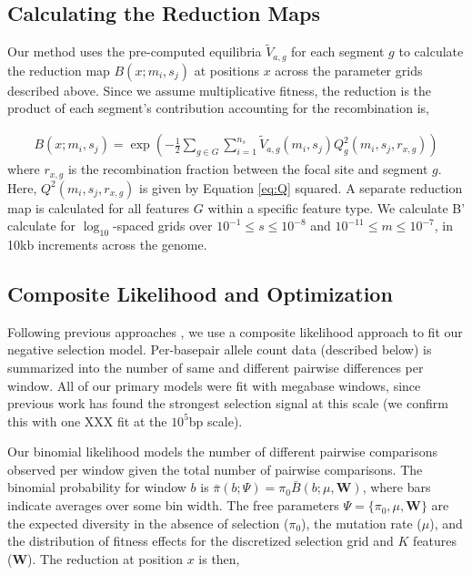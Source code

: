 \documentclass[11pt]{article}
\begin{document}
\subsection*{Calculating the Reduction Maps}
\label{sec:methods-maps}

Our method uses the pre-computed equilibria $\widetilde{V}_{a,g}$ for each
segment $g$ to calculate the reduction map $B(x; m_i, s_j)$ at positions $x$
across the parameter grids described above. Since we assume multiplicative
fitness, the reduction is the product of each segment's contribution accounting
for the recombination is,

\begin{align}
    B(x; m_i, s_j) = \exp\left(- \frac{1}{2}\sum_{g \in G} \sum_{i=1}^{n_s} \widetilde{V}_{a,g}(m_i, s_j) Q_g^2(m_i, s_j, r_{x, g})\right)
\end{align}
%
where $r_{x, g}$ is the recombination fraction between the focal site and
segment $g$. Here, $Q^2(m_i, s_j, r_{x,g})$ is given by Equation \eqref{eq:Q}
squared. A separate reduction map is calculated for all features $G$ within a
specific feature type. We calculate B' calculate for $\log_{10}$-spaced grids
over $10^{-1} \le s \le 10^{-8}$ and $10^{-11} \le m \le 10^{-7}$, in 10kb
increments across the genome.

\subsection*{Composite Likelihood and Optimization}
\label{sec:methods-likelihood}

Following previous approaches
\parencite{McVicker2009-ax,Elyashiv2016-vt,Murphy2022-sj}, we use a composite
likelihood approach to fit our negative selection model. Per-basepair allele
count data (described below) is summarized into the number of same and
different pairwise differences per window. All of our primary models were fit
with megabase windows, since previous work has found the strongest selection
signal at this scale (we confirm this with one XXX fit at the $10^5$bp scale).

Our binomial likelihood models the number of different pairwise comparisons
observed per window given the total number of pairwise comparisons. The
binomial probability for window $b$ is $\bar{\pi}(b; \Psi) = \pi_0 \bar{B}(b;
\mu, \mathbf{W})$, where bars indicate averages over some bin width. The free
parameters $\Psi = \{\pi_0, \mu, \mathbf{W}\}$ are the expected diversity in
the absence of selection ($\pi_0$), the mutation rate ($\mu$), and the
distribution of fitness effects for the discretized selection grid and $K$
features ($\mathbf{W}$). The reduction at position $x$ is then,
\end{document}
